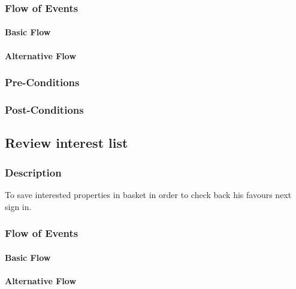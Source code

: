\documentclass[a4paper,12pt]{article}
\begin{document}
\subsubsection{Flow of Events}
\paragraph{Basic Flow}
\begin{itemize}
\end{itemize}

\paragraph{Alternative Flow}
\begin{itemize}
\end{itemize}

\subsubsection{Pre-Conditions}
\subsubsection{Post-Conditions}

\subsection{Review interest list}
\subsubsection{Description}
To save interested properties in basket in order to check back his favours next sign in.
\subsubsection{Flow of Events}
\paragraph{Basic Flow}
\begin{itemize}
\end{itemize}

\paragraph{Alternative Flow}
\begin{itemize}
\end{itemize}
\end{document}
